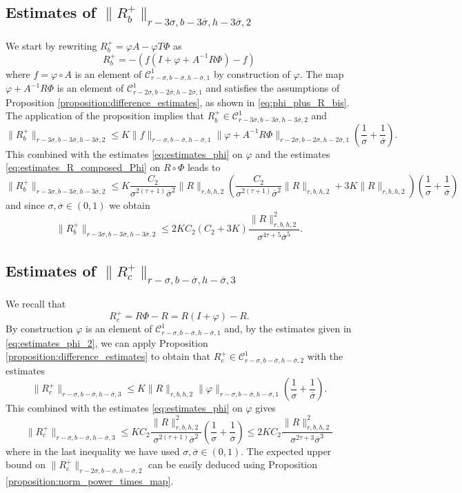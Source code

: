 \documentclass[10pt]{article}
\begin{document}
\subsection{Estimates of $\|R_b^+\|_{r-3\sigma,b-3\overline\sigma,h-3\overline\sigma,2}$}
We start by rewriting $R_b^+ = \varphi A-\varphi T\Phi$ as
\[
R_b^+ = -\left(f(I+\varphi+A^{-1}R\Phi)-f\right)
\]
where $f=\varphi\circ A$ is an element of $\mathscr C^1_{r-\sigma,b-\overline\sigma,h-\overline\sigma,1}$ by construction of $\varphi$.
The map $\varphi+A^{-1}R\Phi$ is an element of $\mathscr C^1_{r-2\sigma,b-2\overline\sigma,h-2\overline\sigma,1}$ and
satisfies the assumptions of 
Proposition \ref{proposition:difference_estimates},
as shown in \eqref{eq:phi_plus_R_bis}. The application of the proposition implies that
$R_b^+\in \mathscr C^1_{r-3\sigma,b-3\overline\sigma,h-3\overline\sigma,2}$ and 
\[
\|R_b^+\|_{r-3\sigma,b-3\overline\sigma,h-3\overline\sigma,2}
\leq 
K\|f\|_{r-\sigma,b-\overline\sigma,h-\overline\sigma,1}
\|\varphi+A^{-1}R\Phi\|_{r-2\sigma,b-2\overline\sigma,h-2\overline\sigma,1}
 \left(\frac{1}{\sigma}+\frac{1}{\overline\sigma}\right). 
 \]
This combined with the estimates \eqref{eq:estimates_phi} on $\varphi$ and the estimates \eqref{eq:estimates_R_composed_Phi} on $R\circ\Phi$ leads to
 \[
 \|R_b^+\|_{r-3\sigma,b-3\overline\sigma,h-3\overline\sigma,2}
 \leq
 K\frac{C_2}{\sigma^{2(\tau+1)}\overline\sigma^2}\|R\|_{r,b,h,2} 
 \left(
 \frac{C_2}{\sigma^{2(\tau+1)}\overline\sigma^2}\|R\|_{r,b,h,2}
 +
 3K\|R\|_{r,b,h,2}\right)\left(\frac{1}{\sigma}+\frac{1}{\overline\sigma}\right)
 \]
and since $\sigma,\overline\sigma\in(0,1)$ we obtain
\[
 \|R_b^+\|_{r-3\sigma,b-3\overline\sigma,h-3\overline\sigma,2}
 \leq 
 2KC_2(C_2+3K)
 \frac{\|R\|_{r,b,h,2}^2}{\sigma^{4\tau+5}\overline\sigma^5}.
\]

\subsection{Estimates of $\|R_c^+\|_{r-\sigma,b-\overline\sigma,h-\overline\sigma,3}$}
We recall that 
\[
R_c^+ = R\Phi - R = R(I+\varphi)-R.
\]
By construction $\varphi$ is an element of $\mathscr C^1_{r-\sigma,b-\overline\sigma,h-\overline\sigma,1}$ and, by the estimates given in \eqref{eq:estimates_phi_2}, we can apply Proposition \ref{proposition:difference_estimates} to obtain that 
$R_c^+\in \mathscr C^1_{r-\sigma,b-\overline\sigma,h-\overline\sigma,2}$ with the estimates
\[
\|R_c^+\|_{r-\sigma,b-\overline\sigma,h-\overline\sigma,3} \leq
K\|R\|_{r,b,h,2}
\|\varphi\|_{r-\sigma,b-\overline\sigma,h-\overline\sigma,1} \left(\frac{1}{\sigma}
+\frac{1}{\overline\sigma}\right).
\]
This combined with the estimates \eqref{eq:estimates_phi} on $\varphi$ gives
\[ 
\|R_c^+\|_{r-\sigma,b-\overline\sigma,h-\overline\sigma,3}
\leq 
KC_2
\frac{\|R\|_{r,b,h,2}^2}{\sigma^{2(\tau+1)}\overline\sigma^2}
\left(\frac{1}{\sigma}+\frac{1}{\overline\sigma}\right)
\leq 
2KC_2
\frac{\|R\|_{r,b,h,2}^2}{\sigma^{2\tau+3}\overline\sigma^3}
\]
where in the last inequality we have used $\sigma,\overline\sigma\in(0,1)$.
The expected upper bound on $\|R_c^+\|_{r-2\sigma,b-\overline\sigma,h-\overline\sigma,2}$ can be easily deduced using Proposition \ref{proposition:norm_power_times_map}.
\end{document}

